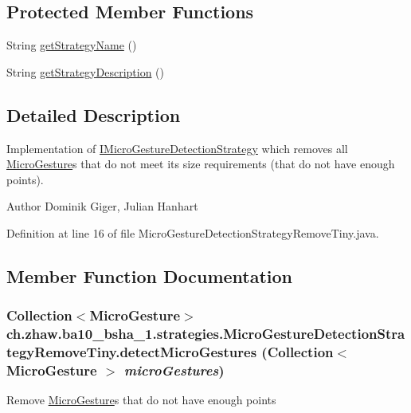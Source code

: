 \subsection*{Protected Member Functions}
\begin{DoxyCompactItemize}
\item 
String \hyperlink{classch_1_1zhaw_1_1ba10__bsha__1_1_1strategies_1_1MicroGestureDetectionStrategyRemoveTiny_a95ac0cb1ddbc1a667e2b5c2dd05dbcdf}{getStrategyName} ()
\item 
String \hyperlink{classch_1_1zhaw_1_1ba10__bsha__1_1_1strategies_1_1MicroGestureDetectionStrategyRemoveTiny_a4b884732838b849076ba7563111496d2}{getStrategyDescription} ()
\end{DoxyCompactItemize}


\subsection{Detailed Description}
Implementation of \hyperlink{interfacech_1_1zhaw_1_1ba10__bsha__1_1_1strategies_1_1IMicroGestureDetectionStrategy}{IMicroGestureDetectionStrategy} which removes all \hyperlink{}{MicroGesture}s that do not meet its size requirements (that do not have enough points).

\begin{DoxyAuthor}{Author}
Dominik Giger, Julian Hanhart 
\end{DoxyAuthor}


Definition at line 16 of file MicroGestureDetectionStrategyRemoveTiny.java.

\subsection{Member Function Documentation}
\hypertarget{classch_1_1zhaw_1_1ba10__bsha__1_1_1strategies_1_1MicroGestureDetectionStrategyRemoveTiny_a3a51833545b6e87173dbacf505e44359}{
\subsubsection[{detectMicroGestures}]{\setlength{\rightskip}{0pt plus 5cm}Collection$<${\bf MicroGesture}$>$ ch.zhaw.ba10\_\-bsha\_\-1.strategies.MicroGestureDetectionStrategyRemoveTiny.detectMicroGestures (Collection$<$ {\bf MicroGesture} $>$ {\em microGestures})}}
\label{classch_1_1zhaw_1_1ba10__bsha__1_1_1strategies_1_1MicroGestureDetectionStrategyRemoveTiny_a3a51833545b6e87173dbacf505e44359}
Remove \hyperlink{}{MicroGesture}s that do not have enough points


